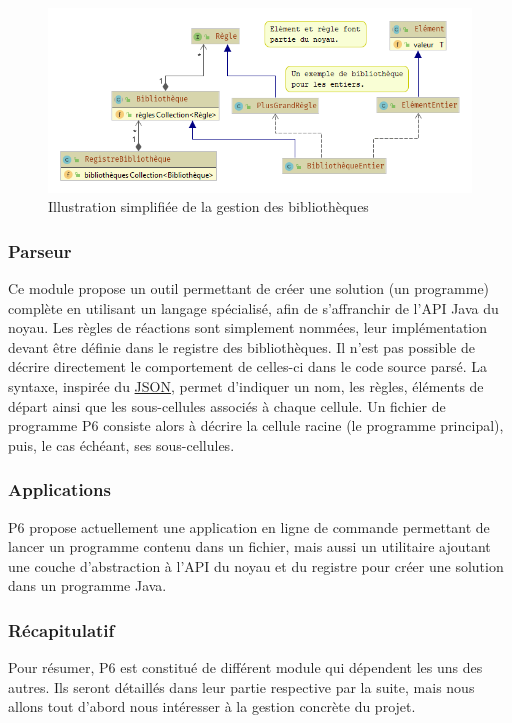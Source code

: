 \documentclass[a4paper, 12pt]{article}
\begin{document}
\begin{figure}[!ht]
  \centering
  \includegraphics[scale=0.7]{./img/Structure_bibliotheque.png}
  \caption{Illustration simplifiée de la gestion des bibliothèques}
\end{figure}

\subsubsection{Parseur}
Ce module propose un outil permettant de créer une solution (un programme) complète en utilisant un langage spécialisé, afin de s’affranchir de l’API Java du noyau. Les règles de réactions sont simplement nommées, leur implémentation devant être définie dans le registre des bibliothèques. Il n’est pas possible de décrire directement le comportement de celles-ci dans le code source parsé. La syntaxe, inspirée du \href{https://json.org/}{JSON}, permet d’indiquer un nom, les règles, éléments de départ ainsi que les sous-cellules associés à chaque cellule. Un fichier de programme P6 consiste alors à décrire la cellule racine (le programme principal), puis, le cas échéant, ses sous-cellules.

\subsubsection{Applications}
P6 propose actuellement une application en ligne de commande permettant de lancer un programme contenu dans un fichier, mais aussi un utilitaire ajoutant une couche d’abstraction à l’API du noyau et du registre pour créer une solution dans un programme Java.

\subsubsection{Récapitulatif}
Pour résumer, P6 est constitué de différent module qui dépendent les uns des autres. Ils seront détaillés dans leur partie respective par la suite, mais nous allons tout d’abord nous intéresser à la gestion concrète du projet.
\end{document}
